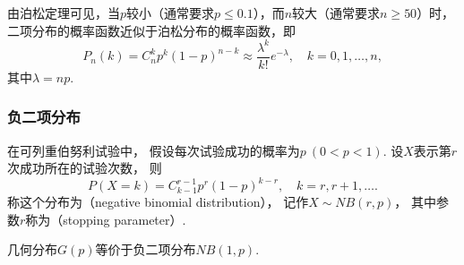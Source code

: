 由泊松定理可见，当\(p\)较小（通常要求\(p \leq 0.1\)），而\(n\)较大（通常要求\(n \geq 50\)）时，
二项分布的概率函数近似于泊松分布的概率函数，即\[
	P_n(k) = C_n^k p^k (1-p)^{n-k}
	\approx \frac{\lambda^k}{k!} e^{-\lambda},
	\quad k=0,1,\dotsc,n,
\]
其中\(\lambda = n p\).

\subsubsection{负二项分布}
\begin{definition}
在可列重伯努利试验中，
假设每次试验成功的概率为\(p\ (0<p<1)\).
设\(X\)表示第\(r\)次成功所在的试验次数，
则\begin{equation}
	P(X=k) = C_{k-1}^{r-1} p^r (1-p)^{k-r},
	\quad k=r,r+1,\dotsc.
\end{equation}
称这个分布为（negative binomial distribution），
记作\(X \sim NB(r,p)\)，
其中参数\(r\)称为（stopping parameter）.
\end{definition}

几何分布\(G(p)\)等价于负二项分布\(NB(1,p)\).
